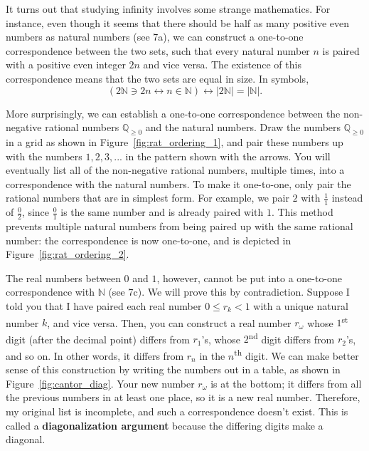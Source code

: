 \documentclass[../textbook.tex]{subfiles}
\begin{document}
\noindent It turns out that studying infinity involves some strange mathematics. For instance, even though it seems that there should be half as many positive even numbers as natural numbers (see 7a), we can construct a one-to-one correspondence between the two sets, such that every natural number $n$ is paired with a positive even integer $2n$ and vice versa. The existence of this correspondence means that the two sets are equal in size. In symbols, $$(2\mathbb{N} \ni 2n \leftrightarrow n \in \mathbb{N}) \leftrightarrow |2\mathbb{N}|=|\mathbb{N}|.$$ %

\noindent More surprisingly, we can establish a one-to-one correspondence between the non-negative rational numbers $\mathbb{Q}_{\geq 0}$ and the natural numbers. Draw the numbers $\mathbb{Q}_{\geq 0}$ in a grid as shown in Figure~\ref{fig:rat_ordering_1}, and pair these numbers up with the numbers $1,2,3,...$ in the pattern shown with the arrows. You will eventually list all of the non-negative rational numbers, multiple times, into a correspondence with the natural numbers. To make it
one-to-one, only pair the rational numbers that are in simplest form. For example, we pair $2$ with $\frac{1}{1}$ instead of $\frac{0}{2}$, since $\frac{0}{1}$ is the same number and is already paired with $1$. This method prevents multiple natural numbers from being paired up with the same rational number: the correspondence is now one-to-one, and is depicted in Figure~\ref{fig:rat_ordering_2}.

The real numbers between $0$ and $1$, however, cannot be put into a one-to-one correspondence with $\mathbb{N}$ (see 7c). We will prove this by contradiction. Suppose I told you that I have paired each real number $0 \leq r_k < 1$ with a unique natural number $k$, and vice versa. Then, you can construct a real number $r_\omega$ whose $1$\textsuperscript{st} digit (after the decimal point) differs from $r_1$’s, whose $2$\textsuperscript{nd} digit differs from $r_2$’s, and so on. In other words, it differs from $r_n$ in the $n$\textsuperscript{th} digit. We can make better sense of this construction by writing the numbers out in a table, as shown in Figure~\ref{fig:cantor_diag}. Your new number $r_\omega$ is at the bottom; it differs from all the previous numbers in at least one place, so it is a new real number. Therefore, my original list is incomplete, and such a correspondence doesn’t exist. This is called a \textbf{diagonalization argument} because the differing digits make a diagonal. %
\end{document}
